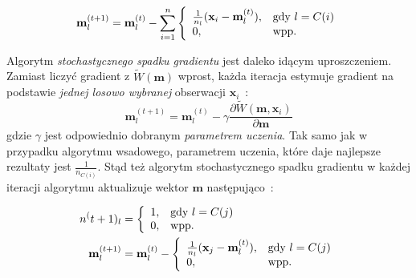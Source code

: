 \documentclass{praca1}
\begin{document}


\begin{equation}
\mathbf{m}_l^{(t+1)} = \mathbf{m}_l^{(t)} - \sum\limits_{i=1}^{n}\left\{
\begin{array}{l l}     
    \frac{1}{n_l}(\mathbf{x}_i - \mathbf{m}^{(t)}_l), & \text{gdy } l = C(i) \\
    0, & \text{wpp.}
\end{array}\right.
\end{equation}

Algorytm \emph{stochastycznego spadku gradientu} jest daleko idącym uproszczeniem. Zamiast liczyć gradient z $\widetilde{W}(\mathbf{m})$ wprost, każda iteracja estymuje gradient na podstawie \emph{jednej losowo wybranej} obserwacji $\mathbf{x}_i$~\cite{bottou2012:sgdtricks}:
\begin{equation}
\mathbf{m}_l^{(t+1)} = \mathbf{m}_l^{(t)} - \gamma \frac{\partial \widetilde{W}(\mathbf{m}, \mathbf{x}_i)}{\partial \mathbf{m}}
\end{equation}
gdzie $\gamma$ jest odpowiednio dobranym \emph{parametrem uczenia}. Tak samo jak w przypadku algorytmu wsadowego, parametrem uczenia, które daje najlepsze rezultaty jest $\frac{1}{n_{C(i)}}$. Stąd też algorytm stochastycznego spadku gradientu w każdej iteracji algorytmu aktualizuje wektor $\mathbf{m}$ następująco~\cite{Bottou1995:convergenceproperties}:

\begin{align}
n^(t+1)_l& = \left\{
\begin{array}{l l}     
    1, & \text{gdy } l = C(j) \\
    0, & \text{wpp.}
\end{array}\right. \\
\mathbf{m}_l^{(t+1)}& = \mathbf{m}_l^{(t)} - \left\{
\begin{array}{l l}     
    \frac{1}{n_l}(\mathbf{x}_j - \mathbf{m}^{(t)}_l), & \text{gdy } l = C(j) \\
    0, & \text{wpp.}
\end{array}\right.
\end{align}

\end{document}
